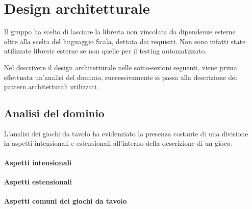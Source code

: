 \section{Design architetturale}




Il gruppo ha scelto di lasciare la libreria non vincolata da dipendenze esterne oltre alla scelta del linguaggio Scala, dettata dai requisiti.
%
Non sono infatti state utilizzate librerie esterne se non quelle per il testing automatizzato.

Nel descrivere il design architetturale nelle sotto-sezioni seguenti, viene prima effettuata un'analisi del dominio, successivamente si passa alla descrizione dei pattern architetturali utilizzati.

\subsection{Analisi del dominio}
L'analisi dei giochi da tavolo ha evidenziato la presenza costante di una divisione in aspetti intensionali e estensionali all'interno della descrizione di un gioco.
%
\paragraph{Aspetti intensionali}
\paragraph{Aspetti estensionali}
%

\paragraph{Aspetti comuni dei giochi da tavolo}

